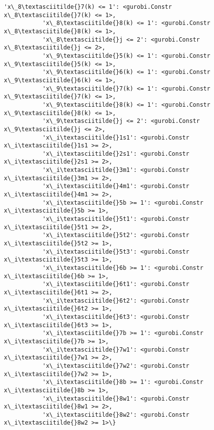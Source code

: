 \documentclass[11pt]{article}
\begin{document}
\begin{Verbatim}[commandchars=\\\{\}]
           'x\_8\textasciitilde{}7(k) <= 1': <gurobi.Constr x\_8\textasciitilde{}7(k) <= 1>,
           'x\_8\textasciitilde{}8(k) <= 1': <gurobi.Constr x\_8\textasciitilde{}8(k) <= 1>,
           'x\_8\textasciitilde{}j <= 2': <gurobi.Constr x\_8\textasciitilde{}j <= 2>,
           'x\_9\textasciitilde{}5(k) <= 1': <gurobi.Constr x\_9\textasciitilde{}5(k) <= 1>,
           'x\_9\textasciitilde{}6(k) <= 1': <gurobi.Constr x\_9\textasciitilde{}6(k) <= 1>,
           'x\_9\textasciitilde{}7(k) <= 1': <gurobi.Constr x\_9\textasciitilde{}7(k) <= 1>,
           'x\_9\textasciitilde{}8(k) <= 1': <gurobi.Constr x\_9\textasciitilde{}8(k) <= 1>,
           'x\_9\textasciitilde{}j <= 2': <gurobi.Constr x\_9\textasciitilde{}j <= 2>,
           'x\_i\textasciitilde{}1s1': <gurobi.Constr x\_i\textasciitilde{}1s1 >= 2>,
           'x\_i\textasciitilde{}2s1': <gurobi.Constr x\_i\textasciitilde{}2s1 >= 2>,
           'x\_i\textasciitilde{}3m1': <gurobi.Constr x\_i\textasciitilde{}3m1 >= 2>,
           'x\_i\textasciitilde{}4m1': <gurobi.Constr x\_i\textasciitilde{}4m1 >= 2>,
           'x\_i\textasciitilde{}5b >= 1': <gurobi.Constr x\_i\textasciitilde{}5b >= 1>,
           'x\_i\textasciitilde{}5t1': <gurobi.Constr x\_i\textasciitilde{}5t1 >= 2>,
           'x\_i\textasciitilde{}5t2': <gurobi.Constr x\_i\textasciitilde{}5t2 >= 1>,
           'x\_i\textasciitilde{}5t3': <gurobi.Constr x\_i\textasciitilde{}5t3 >= 1>,
           'x\_i\textasciitilde{}6b >= 1': <gurobi.Constr x\_i\textasciitilde{}6b >= 1>,
           'x\_i\textasciitilde{}6t1': <gurobi.Constr x\_i\textasciitilde{}6t1 >= 2>,
           'x\_i\textasciitilde{}6t2': <gurobi.Constr x\_i\textasciitilde{}6t2 >= 1>,
           'x\_i\textasciitilde{}6t3': <gurobi.Constr x\_i\textasciitilde{}6t3 >= 1>,
           'x\_i\textasciitilde{}7b >= 1': <gurobi.Constr x\_i\textasciitilde{}7b >= 1>,
           'x\_i\textasciitilde{}7w1': <gurobi.Constr x\_i\textasciitilde{}7w1 >= 2>,
           'x\_i\textasciitilde{}7w2': <gurobi.Constr x\_i\textasciitilde{}7w2 >= 1>,
           'x\_i\textasciitilde{}8b >= 1': <gurobi.Constr x\_i\textasciitilde{}8b >= 1>,
           'x\_i\textasciitilde{}8w1': <gurobi.Constr x\_i\textasciitilde{}8w1 >= 2>,
           'x\_i\textasciitilde{}8w2': <gurobi.Constr x\_i\textasciitilde{}8w2 >= 1>\}
\end{Verbatim}
        

    
    
    
    
\end{document}
